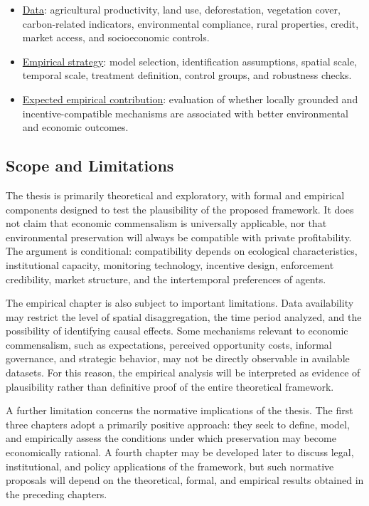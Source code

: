 \begin{itemize}
\begin{itemize}
        \item[iii.] \underline{Data}: agricultural productivity, land use, deforestation, vegetation cover, carbon-related indicators, environmental compliance, rural properties, credit, market access, and socioeconomic controls.

        \item[iv.] \underline{Empirical strategy}: model selection, identification assumptions, spatial scale, temporal scale, treatment definition, control groups, and robustness checks.

        \item[v.] \underline{Expected empirical contribution}: evaluation of whether locally grounded and incentive-compatible mechanisms are associated with better environmental and economic outcomes.

    \end{itemize}

\end{itemize}

\subsection{Scope and Limitations}

The thesis is primarily theoretical and exploratory, with formal and empirical components designed to test the plausibility of the proposed framework. It does not claim that economic commensalism is universally applicable, nor that environmental preservation will always be compatible with private profitability. The argument is conditional: compatibility depends on ecological characteristics, institutional capacity, monitoring technology, incentive design, enforcement credibility, market structure, and the intertemporal preferences of agents.

The empirical chapter is also subject to important limitations. Data availability may restrict the level of spatial disaggregation, the time period analyzed, and the possibility of identifying causal effects. Some mechanisms relevant to economic commensalism, such as expectations, perceived opportunity costs, informal governance, and strategic behavior, may not be directly observable in available datasets. For this reason, the empirical analysis will be interpreted as evidence of plausibility rather than definitive proof of the entire theoretical framework.

A further limitation concerns the normative implications of the thesis. The first three chapters adopt a primarily positive approach: they seek to define, model, and empirically assess the conditions under which preservation may become economically rational. A fourth chapter may be developed later to discuss legal, institutional, and policy applications of the framework, but such normative proposals will depend on the theoretical, formal, and empirical results obtained in the preceding chapters.

